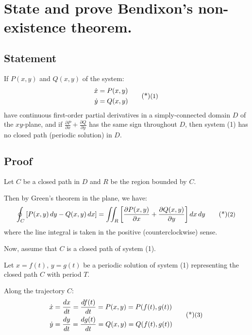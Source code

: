 \section{State and prove Bendixon's non-existence theorem.}
\subsection*{Statement}

If $P(x, y)$ and $Q(x, y)$ of the system:
\begin{equation}
    \begin{aligned}
        \dot{x} &= P(x, y) \\
        \dot{y} &= Q(x, y)
    \end{aligned} \sidenote{1}
\end{equation}
have continuous first-order partial derivatives in a simply-connected domain $D$ of the $xy$-plane, and if $\frac{\partial P}{\partial x} + \frac{\partial Q}{\partial y}$
has the same sign throughout $D$, then system (1) has no closed path (periodic solution) in $D$.
\subsection*{Proof}
Let $C$ be a closed path in $D$ and $R$ be the region bounded by $C$.

\noindent Then by Green's theorem in the plane, we have:
\begin{equation}
    \oint_C \left[ P(x, y) \, dy - Q(x, y) \, dx \right] = \iint_R \left[ \frac{\partial P(x, y)}{\partial x} + \frac{\partial Q(x, y)}{\partial y} \right] dx \, dy \sidenote{2}
\end{equation}
where the line integral is taken in the positive (counterclockwise) sense.

\vspace{0.5em}
\noindent Now, assume that $C$ is a closed path of system (1).

\noindent Let $x = f(t), \, y = g(t)$ be a periodic solution of system (1) representing the closed path $C$ with period $T$.

\noindent Along the trajectory $C$:
\begin{equation}
    \begin{aligned}
        \dot{x} &= \frac{dx}{dt} = \frac{df(t)}{dt} = P(x, y) = P(f(t), g(t)) \\
        \dot{y} &= \frac{dy}{dt} = \frac{dg(t)}{dt} = Q(x, y) = Q(f(t), g(t))
    \end{aligned} \sidenote{3}
\end{equation}

